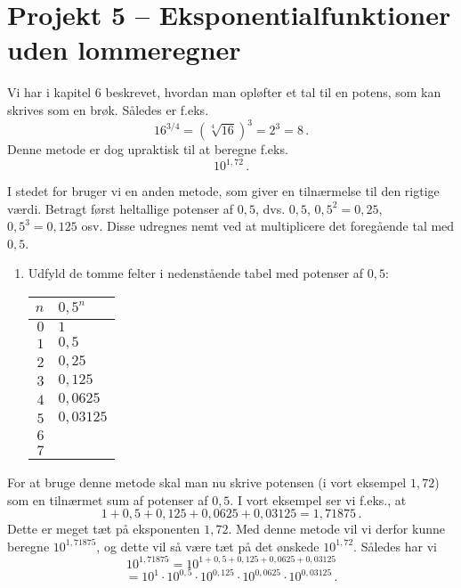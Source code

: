 \documentclass[12pt,oneside,a4paper]{article}
\theoremstyle{plain}
\begin{document}
\section*{Projekt 5 -- Eksponentialfunktioner uden lommeregner}
Vi har i kapitel 6 beskrevet, hvordan man opløfter et tal til en potens, som
kan skrives som en brøk. Således er f.eks.
\[
    16^{3/4} = (\sqrt[4]{16})^3 = 2^3 = 8 \,.
\]
Denne metode er dog upraktisk til at beregne f.eks.
\[
    10^{1,72} \,.
\]

I stedet for bruger vi en anden metode, som giver en tilnærmelse til den
rigtige værdi.  Betragt først heltallige potenser af $0,5$, dvs.
$0,5$, $0,5^2 = 0,25$, $0,5^3 = 0,125$ osv. Disse udregnes nemt ved at multiplicere
det foregående tal med $0,5$.
\begin{enumerate}[label=(\alph*)]
    \item Udfyld de tomme felter i nedenstående tabel med potenser af $0,5$:
        \begin{center}
            \begin{tabular}{|r|l|}
\hline
                $n$ & $0,5^n$ \\
                \hline
                $0$ & $1$ \\
                \hline
                $1$ & $0,5$ \\
                \hline
                $2$ & $0,25$ \\
                \hline
                $3$ & $0,125$ \\
                \hline
                $4$ & $0,0625$ \\
                \hline
                $5$ & $0,03125$ \\
                \hline
                $6$ &  \\
                \hline
                $7$ &  \\
                \hline
            \end{tabular}
        \end{center}
\end{enumerate}

For at bruge denne metode skal man nu skrive potensen (i vort eksempel $1,72$)
som en tilnærmet sum af potenser af $0,5$. I vort eksempel ser vi f.eks., at
\[
    1 + 0,5 + 0,125 + 0,0625 + 0,03125 = 1,71875 \,.
\]
Dette er meget tæt på eksponenten $1,72$. Med denne metode vil vi derfor kunne
beregne $10^{1,71875}$, og dette vil så være tæt på det ønskede $10^{1,72}$.
Således har vi
\[
    10^{1,71875} = 10^{1 + 0,5 + 0,125 + 0,0625 + 0,03125}
\]
\[
    = 10^1 \cdot 10^{0,5} \cdot 10^{0,125} \cdot 10^{0,0625} \cdot 10^{0,03125} \,.
\]
\end{document}
